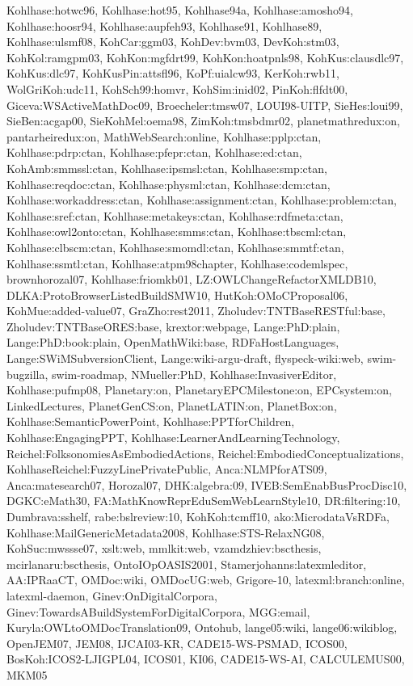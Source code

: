 {Kohlhase:hotwc96,%
Kohlhase:hot95,%
Kohlhase94a,%
Kohlhase:amosho94,%
Kohlhase:hoosr94,%
Kohlhase:aupfeh93,%
Kohlhase91,%
Kohlhase89,%
Kohlhase:ulsmf08,%
KohCar:ggm03,%
KohDev:bvm03,%
DevKoh:stm03,%
KohKol:ramgpm03,%
KohKon:mgfdrt99,%
KohKon:hoatpnls98,%
KohKus:clausdlc97,%
KohKus:dlc97,%
KohKusPin:attsfl96,%
KoPf:uialcw93,%
KerKoh:rwb11,%
WolGriKoh:udc11,%
KohSch99:homvr,%
KohSim:inid02,%
PinKoh:flfdt00,%
Giceva:WSActiveMathDoc09,%
Broecheler:tmsw07,%
LOUI98-UITP,%
SieHes:loui99,%
SieBen:acgap00,%
SieKohMel:oema98,%
ZimKoh:tmsbdmr02,%
planetmathredux:on,%
pantarheiredux:on,%
MathWebSearch:online,%
Kohlhase:pplp:ctan,%
Kohlhase:pdrp:ctan,%
Kohlhase:pfepr:ctan,%
Kohlhase:ed:ctan,%
KohAmb:smmssl:ctan,%
Kohlhase:ipsmsl:ctan,%
Kohlhase:smp:ctan,%
Kohlhase:reqdoc:ctan,%
Kohlhase:physml:ctan,%
Kohlhase:dcm:ctan,%
Kohlhase:workaddress:ctan,%
Kohlhase:assignment:ctan,%
Kohlhase:problem:ctan,%
Kohlhase:sref:ctan,%
Kohlhase:metakeys:ctan,%
Kohlhase:rdfmeta:ctan,%
Kohlhase:owl2onto:ctan,%
Kohlhase:smms:ctan,%
Kohlhase:tbscml:ctan,%
Kohlhase:clbscm:ctan,%
Kohlhase:smomdl:ctan,%
Kohlhase:smmtf:ctan,%
Kohlhase:ssmtl:ctan,%
Kohlhase:atpm98chapter,%
Kohlhase:codemlspec,%
brownhorozal07,%
Kohlhase:friomkb01,%
LZ:OWLChangeRefactorXMLDB10,%
DLKA:ProtoBrowserListedBuildSMW10,%
HutKoh:OMoCProposal06,%
KohMue:added-value07,%
GraZho:rest2011,%
Zholudev:TNTBaseRESTful:base,%
Zholudev:TNTBaseORES:base,%
krextor:webpage,%
Lange:PhD:plain,%
Lange:PhD:book:plain,%
OpenMathWiki:base,%
RDFaHostLanguages,%
Lange:SWiMSubversionClient,%
Lange:wiki-argu-draft,%
flyspeck-wiki:web,%
swim-bugzilla,%
swim-roadmap,%
NMueller:PhD,%
Kohlhase:InvasiverEditor,%
Kohlhase:pufmp08,%
Planetary:on,%
PlanetaryEPCMilestone:on,%
EPCsystem:on,%
LinkedLectures,%
PlanetGenCS:on,%
PlanetLATIN:on,%
PlanetBox:on,%
Kohlhase:SemanticPowerPoint,%
Kohlhase:PPTforChildren,%
Kohlhase:EngagingPPT,%
Kohlhase:LearnerAndLearningTechnology,%
Reichel:FolksonomiesAsEmbodiedActions,%
Reichel:EmbodiedConceptualizations,%
KohlhaseReichel:FuzzyLinePrivatePublic,%
Anca:NLMPforATS09,%
Anca:matesearch07,%
Horozal07,%
DHK:algebra:09,%
IVEB:SemEnabBusProcDisc10,%
DGKC:eMath30,%
FA:MathKnowReprEduSemWebLearnStyle10,%
DR:filtering:10,%
Dumbrava:sshelf,%
rabe:bslreview:10,%
KohKoh:tcmff10,%
ako:MicrodataVsRDFa,%
Kohlhase:MailGenericMetadata2008,%
Kohlhase:STS-RelaxNG08,%
KohSuc:mwssse07,%
xslt:web,%
mmlkit:web,%
vzamdzhiev:bscthesis,%
mcirlanaru:bscthesis,%
OntoIOpOASIS2001,%
Stamerjohanns:latexmleditor,%
AA:IPRaaCT,%
OMDoc:wiki,%
OMDocUG:web,%
Grigore-10,%
latexml:branch:online,%
latexml-daemon,%
Ginev:OnDigitalCorpora,%
Ginev:TowardsABuildSystemForDigitalCorpora,%
MGG:email,%
Kuryla:OWLtoOMDocTranslation09,%
Ontohub,%
lange05:wiki,%
lange06:wikiblog,%
OpenJEM07,%
JEM08,%
IJCAI03-KR,%
CADE15-WS-PSMAD,%
ICOS00,%
BosKoh:ICOS2-LJIGPL04,%
ICOS01,%
KI06,%
CADE15-WS-AI,%
CALCULEMUS00,%
MKM05%
}
